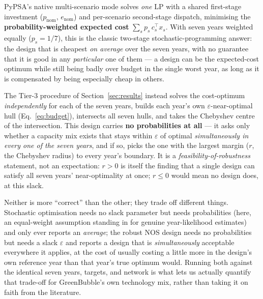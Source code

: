\documentclass[11pt]{article}
\begin{document}
\begin{description}[leftmargin=1.4em]
  \item[Equal-weight stochastic optimisation.] PyPSA's native
    multi-scenario mode solves \emph{one} LP with a shared first-stage
    investment ($p_{\mathrm{nom}}$, $e_{\mathrm{nom}}$) and per-scenario
    second-stage dispatch, minimising the \textbf{probability-weighted
    expected cost} $\sum_s p_s\, c_s^\top x_s$. With seven years weighted
    equally ($p_s = 1/7$), this is the classic two-stage stochastic-programming
    answer: the design that is cheapest \emph{on average} over the seven
    years, with no guarantee that it is good in any \emph{particular} one of
    them --- a design can be the expected-cost optimum while still being
    badly over budget in the single worst year, as long as it is
    compensated by being especially cheap in others.
  \item[Chebyshev-centre robust NOS design.] The Tier-3 procedure of
    Section~\ref{sec:results} instead solves the cost-optimum
    \emph{independently} for each of the seven years, builds each year's own
    $\varepsilon$-near-optimal hull (Eq.~\ref{eq:budget}), intersects all
    seven hulls, and takes the Chebyshev centre of the intersection. This
    design carries \textbf{no probabilities at all} --- it asks only
    whether a capacity mix exists that stays within $\varepsilon$ of
    optimal \emph{simultaneously in every one of the seven years}, and if
    so, picks the one with the largest margin ($r$, the Chebyshev radius) to
    every year's boundary. It is a \emph{feasibility-of-robustness}
    statement, not an expectation: $r > 0$ is itself the finding that a
    single design can satisfy all seven years' near-optimality at once;
    $r \le 0$ would mean no design does, at this slack.
\end{description}
Neither is more ``correct'' than the other; they trade off different
things. Stochastic optimisation needs no slack parameter but needs
probabilities (here, an equal-weight assumption standing in for genuine
year-likelihood estimates) and only ever reports an \emph{average}; the
robust NOS design needs no probabilities but needs a slack $\varepsilon$
and reports a design that is \emph{simultaneously} acceptable everywhere it
applies, at the cost of usually costing a little more in the design's own
reference year than that year's true optimum would. Running both against
the identical seven years, targets, and network is what lets us actually
quantify that trade-off for GreenBubble's own technology mix, rather than
taking it on faith from the literature.
\end{document}
